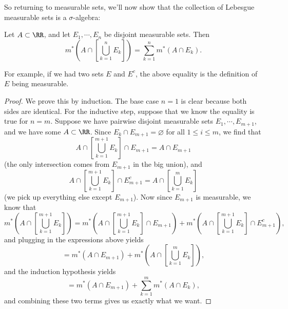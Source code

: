So returning to measurable sets, we'll now show that the collection of Lebesgue measurable sets is a $\sigma$-algebra:

\begin{proposition}\label{disjmeasprop}
Let $A \subset \RR$, and let $E_1, \cdots, E_n$ be disjoint measurable sets. Then 
\[
    m^\ast\left(A \cap \left[\bigcup_{k=1}^n E_k\right]\right) = \sum_{k=1}^n m^\ast(A \cap E_k).
\]
\end{proposition}

For example, if we had two sets $E$ and $E^c$, the above equality is the definition of $E$ being measurable.

\begin{proof}
We prove this by induction. The base case $n = 1$ is clear because both sides are identical. For the inductive step, suppose that we know the equality is true for $n = m$. Suppose we have pairwise disjoint measurable sets $E_1, \cdots, E_{m+1}$, and we have some $A \subset \RR$. Since $E_k \cap E_{m+1} = \varnothing$ for all $1 \le i \le m$, we find that 
\[
    A \cap \left[\bigcup_{k=1}^{m+1} E_k\right] \cap E_{m+1} = A \cap E_{m+1}
\]
(the only intersection comes from $E_{m+1}$ in the big union), and 
\[
    A \cap \left[\bigcup_{k=1}^{m+1} E_k\right] \cap E_{m+1}^c = A \cap \left[\bigcup_{k=1}^{m} E_k\right]
\]
(we pick up everything else except $E_{m+1}$). Now since $E_{m+1}$ is measurable, we know that
\[
    m^\ast\left(A \cap \left[\bigcup_{k=1}^{m+1} E_k\right]\right) = m^\ast\left(A \cap \left[\bigcup_{k=1}^{m+1} E_k\right] \cap E_{m+1}\right) + m^\ast\left(A \cap \left[\bigcup_{k=1}^{m+1} E_k\right] \cap E_{m+1}^c\right),
\]
and plugging in the expressions above yields 
\[
    = m^\ast(A \cap E_{m+1}) + m^\ast\left(A \cap \left[\bigcup_{k=1}^{m} E_k\right]\right),
\]
and the induction hypothesis yields 
\[
    = m^\ast(A \cap E_{m+1}) + \sum_{k=1}^m m^\ast(A \cap E_k),
\]
and combining these two terms gives us exactly what we want. 
\end{proof}

